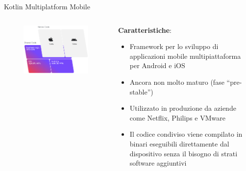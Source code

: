 \begin{frame}{Kotlin Multiplatform Mobile}
    \begin{columns}[onlytextwidth]
        \begin{column}{0.55\textwidth}
             \begin{figure}[H]
                \includegraphics[width=1\textwidth]{img/kmm-stack-official.png}
            \end{figure}
        \end{column}
        \begin{column}{0.45\textwidth}
            \textbf{Caratteristiche}:
            \begin{itemize}
                \item Framework per lo sviluppo di applicazioni mobile multipiattaforma per Android e iOS
                \item Ancora non molto maturo (fase ``pre-stable'')
                \item Utilizzato in produzione da aziende come Netflix, Philips e VMware
                \item Il codice condiviso viene compilato in binari eseguibili direttamente dal dispositivo senza il bisogno di strati software aggiuntivi
            \end{itemize}
        \end{column}
    \end{columns}
\end{frame}